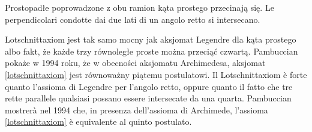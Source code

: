 \begin{axiom}
[Lotschnittaxiom] %
[Lotschnittaxiom] %
\label{lotschnittaxiom}%
	Prostopadłe poprowadzone z obu ramion kąta prostego przecinają się. %
	Le perpendicolari condotte dai due lati di un angolo retto si intersecano. %
\end{axiom}

Lotschnittaxiom jest tak samo mocny jak aksjomat Legendre dla kąta prostego albo fakt, że każde trzy równoległe proste można przeciąć czwartą. %
Pambuccian pokaże w 1994 roku, że w obecności aksjomatu Archimedesa, aksjomat \ref{lotschnittaxiom} jest równoważny piątemu postulatowi. %
Il Lotschnittaxiom è forte quanto l'assioma di Legendre per l'angolo retto, oppure quanto il fatto che tre rette parallele qualsiasi possano essere intersecate da una quarta. %
Pambuccian mostrerà nel 1994 che, in presenza dell'assioma di Archimede, l'assioma \ref{lotschnittaxiom} è equivalente al quinto postulato. %

